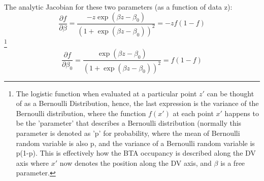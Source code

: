 The analytic Jacobian for these two parameters (as a function of data z):
\begin{equation}
\frac{\partial{ f}}{\partial{ \beta}} = \frac{-z\exp{(\beta z-\beta_0)}}{(1+\exp{(\beta z-\beta_0)})^2}=-z f(1-f)
\end{equation} \footnote{The logistic function when evaluated at a particular point $z'$ can be thought of as a Bernoulli Distribution, hence, the last expression is the variance of the Bernoulli distribution, where the function $f(x')$ at each point $x'$ happens to be the 'parameter' that describes a Bernoulli distribution (normally this parameter is denoted as 'p' for probability, where the mean of Bernoulli random variable is also p, and the variance of a Bernoulli random variable is p(1-p).  This is effectively how the BTA occupancy is described along the DV axis where $x'$ now denotes the position along the DV axis, and $\beta$ is a free parameter.}
\begin{equation}
\frac{\partial{f}}{\partial{ \beta_0}} = \frac{\exp{(\beta z - \beta_0)}}{(1+\exp{(\beta z-\beta_0)})^2}= f(1-f)
\end{equation}
